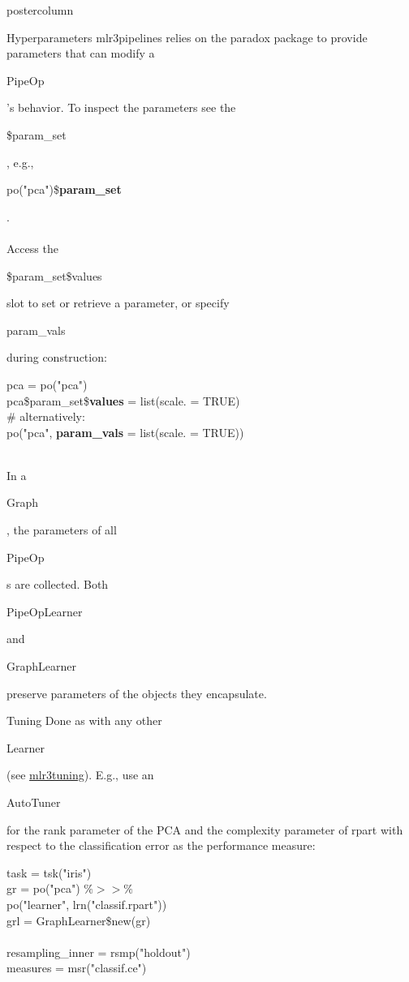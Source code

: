 \documentclass{beamer}
\newlength{\columnheight} %
\newcommand{\codeinline}[1]{\begin{codeboxinline}#1\end{codeboxinline}}
\begin{document}
\begin{frame}[fragile]{}
\begin{columns}
\begin{column}{.245\textwidth}
\begin{beamercolorbox}[center]{postercolumn}
				\begin{minipage}{.98\textwidth}
					\parbox[t][\columnheight]{\textwidth}{
            \begin{myblock}{Hyperparameters}
              mlr3pipelines relies on the paradox package to provide parameters that can modify a \codeinline{PipeOp}'s behavior. To inspect the parameters see the \codeinline{\$param\_set}, e.g., \codeinline{po("pca")\$\textbf{param\_set}}.\\
              \ \\
              Access the \codeinline{\$param\_set\$values} slot to set or retrieve a parameter, or specify \codeinline{param\_vals} during construction:
              \begin{codeboxmultiline}[width=25cm]
                pca = po("pca") \\
                pca\$param\_set\$\textbf{values} = list(scale. = TRUE) \\
                \# alternatively:\\
                po("pca", \textbf{param\_vals} = list(scale. = TRUE))
              \end{codeboxmultiline}
              \ \\
              In a \codeinline{Graph}, the parameters of all \codeinline{PipeOp}s are collected. Both \codeinline{PipeOpLearner} and \codeinline{GraphLearner} preserve parameters of the objects they encapsulate.
            \end{myblock}
            \begin{myblock}{Tuning}
              Done as with any other \codeinline{Learner} (see \href{FIXME:CheatsheetLink}{mlr3tuning}). E.g., use an \codeinline{AutoTuner} for the rank parameter of the PCA and the complexity parameter of rpart with respect to the classification error as the performance measure:
              \begin{codeboxexample}
						  {\footnotesize
                task = tsk("iris")\\
                gr = po("pca") $\%>>\%$\\
                \hspace*{1ex} po("learner", lrn("classif.rpart"))\\
                grl = GraphLearner\$new(gr)\\
                \ \\
                resampling\_inner = rsmp("holdout")\\
                measures = msr("classif.ce")\\
}
\end{codeboxexample}
\end{myblock}}
\end{minipage}
\end{beamercolorbox}
\end{column}
\end{columns}
\end{frame}
\end{document}
